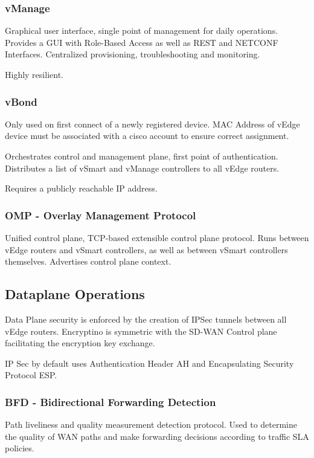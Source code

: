 \subsubsection{vManage}
Graphical user interface, single point of management for daily operations. 
Provides a GUI with Role-Based Access as well as REST and NETCONF Interfaces.
Centralized provisioning, troubleshooting and monitoring.

Highly resilient.

\subsubsection{vBond}
Only used on first connect of a newly registered device. MAC Address of vEdge device must be associated with a cisco account 
to ensure correct assignment.

Orchestrates control and management plane, first point of authentication. Distributes a list of vSmart and vManage controllers to 
all vEdge routers.  

Requires a publicly reachable IP address.

\subsubsection{OMP - Overlay Management Protocol}
Unified control plane, TCP-based extensible control plane protocol.
Runs between vEdge routers and vSmart controllers, as well as between vSmart controllers themselves.
Advertises control plane context.

\subsection{Dataplane Operations}

Data Plane security is enforced by the creation of IPSec tunnels between all vEdge routers.
Encryptino is symmetric with the SD-WAN Control plane facilitating the encryption key exchange.

IP Sec by default uses Authentication Header AH and Encapsulating Security Protocol ESP. 

\subsubsection{BFD - Bidirectional Forwarding Detection}
Path liveliness and quality measurement detection protocol. Used to determine the quality of WAN paths and 
make forwarding decisions according to traffic SLA policies.

